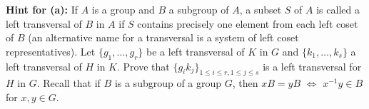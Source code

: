 \documentclass[12pt]{amsart}
\begin{document}
{\bf Hint for (a):} If $A$ is a group and $B$ a subgroup of $A$, a
subset $S$ of $A$ is called a left transversal of $B$ in $A$
if $S$ contains precisely one element from each left coset of $B$
(an alternative name for a transversal is a system of left coset representatives).
Let $\{g_1,\ldots, g_r\}$ be a left transversal of $K$ in $G$
and $\{k_1,\ldots, k_s\}$ a left transversal of $H$ in $K$. Prove
that $\{g_i k_j\}_{1\leq i\leq r, 1\leq j\leq s}$ is a left transversal for $H$ in $G$.
Recall that if $B$ is a subgroup of a group $G$, then $xB=yB$ $\iff$ $x^{-1}y\in B$
for $x,y\in G$.
\end{document}
